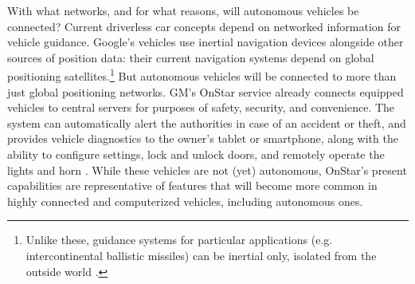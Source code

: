 
With what networks, and for what reasons, will autonomous vehicles be
connected? Current driverless car concepts depend on networked
information for vehicle guidance.
Google's vehicles use inertial navigation devices \cite{knightFurther}
alongside other sources of position data: their current navigation systems
depend on global positioning satellites.\footnote{Unlike these,
guidance systems for particular applications (e.g. intercontinental ballistic
missiles) can be inertial only, isolated from the outside world
\cite{mackenzie}.} But autonomous
vehicles will be connected to more than just global positioning
networks. GM's OnStar service already connects equipped vehicles to central servers for
purposes of safety, security, and convenience. The system can
automatically alert the authorities in case of an accident 
or theft, and provides vehicle diagnostics to the owner's tablet
or smartphone, along with the ability to
configure settings, lock and 
unlock doors, and remotely operate the lights and horn \cite{onstar}.
While these vehicles are not (yet) autonomous, OnStar's present
capabilities are representative of features that will become more common in highly
connected and computerized vehicles, including autonomous ones.



